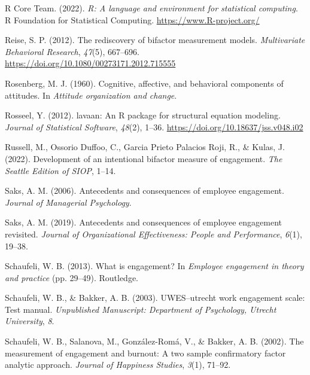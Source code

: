 \documentclass[
  man]{apa6}
\newlength{\cslhangindent}
\newlength{\cslentryspacingunit} %
\newenvironment{CSLReferences}[2] %
 {%
  \setlength{\parindent}{0pt}
  \ifodd #1
  \let\oldpar\par
  \def\par{\hangindent=\cslhangindent\oldpar}
  \fi
  \setlength{\parskip}{#2\cslentryspacingunit}
 }%
 {}
\begin{document}
\begin{CSLReferences}{1}{0}
\leavevmode{}%
R Core Team. (2022). \emph{R: A language and environment for statistical computing}. R Foundation for Statistical Computing. \url{https://www.R-project.org/}

\leavevmode{}%
Reise, S. P. (2012). The rediscovery of bifactor measurement models. \emph{Multivariate Behavioral Research}, \emph{47}(5), 667--696. \url{https://doi.org/10.1080/00273171.2012.715555}

\leavevmode{}%
Rosenberg, M. J. (1960). Cognitive, affective, and behavioral components of attitudes. In \emph{Attitude organization and change}.

\leavevmode{}%
Rosseel, Y. (2012). {lavaan}: An {R} package for structural equation modeling. \emph{Journal of Statistical Software}, \emph{48}(2), 1--36. \url{https://doi.org/10.18637/jss.v048.i02}

\leavevmode{}%
Russell, M., Ossorio Duffoo, C., Garcia Prieto Palacios Roji, R., \& Kulas, J. (2022). Development of an intentional bifactor measure of engagement. \emph{The Seattle Edition of SIOP}, 1--14.

\leavevmode{}%
Saks, A. M. (2006). Antecedents and consequences of employee engagement. \emph{Journal of Managerial Psychology}.

\leavevmode{}%
Saks, A. M. (2019). Antecedents and consequences of employee engagement revisited. \emph{Journal of Organizational Effectiveness: People and Performance}, \emph{6}(1), 19--38.

\leavevmode{}%
Schaufeli, W. B. (2013). What is engagement? In \emph{Employee engagement in theory and practice} (pp. 29--49). Routledge.

\leavevmode{}%
Schaufeli, W. B., \& Bakker, A. B. (2003). {UWES}--utrecht work engagement scale: Test manual. \emph{Unpublished Manuscript: Department of Psychology, Utrecht University}, \emph{8}.

\leavevmode{}%
Schaufeli, W. B., Salanova, M., González-Romá, V., \& Bakker, A. B. (2002). The measurement of engagement and burnout: A two sample confirmatory factor analytic approach. \emph{Journal of Happiness Studies}, \emph{3}(1), 71--92.


\end{CSLReferences}
\end{document}
